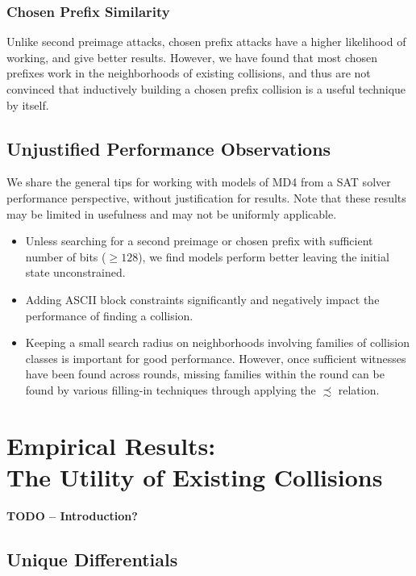 \documentclass[conference]{IEEEtran}
\begin{document}
\subsubsection{Chosen Prefix Similarity}

Unlike second preimage attacks, chosen prefix attacks have a higher likelihood
of working, and give better results. However, we have found that most chosen
prefixes work in the neighborhoods of existing collisions, and thus are not
convinced that inductively building a chosen prefix collision is a useful
technique by itself.


\subsection{Unjustified Performance Observations}

We share the general tips for working with models of MD4 from a SAT solver
performance perspective, without justification for results. Note that these
results may be limited in usefulness and may not be uniformly applicable.
\begin{itemize}
    \item Unless searching for a second preimage or chosen prefix with
        sufficient number of bits ($\geq 128$), we find models perform better
        leaving the initial state unconstrained.
    \item Adding ASCII block constraints significantly and negatively impact
        the performance of finding a collision.
    \item Keeping a small search radius on neighborhoods involving families
        of collision classes is important for good performance. However,
        once sufficient witnesses have been found across rounds, missing
        families within the round can be found by various filling-in
        techniques through applying the $\precsim$ relation.
\end{itemize}






\section{Empirical Results:\\The Utility of Existing Collisions}
\label{Sec:Empirical}

\textbf{TODO -- Introduction?}

\subsection{Unique Differentials} \label{empirical:differentials}
\end{document}

